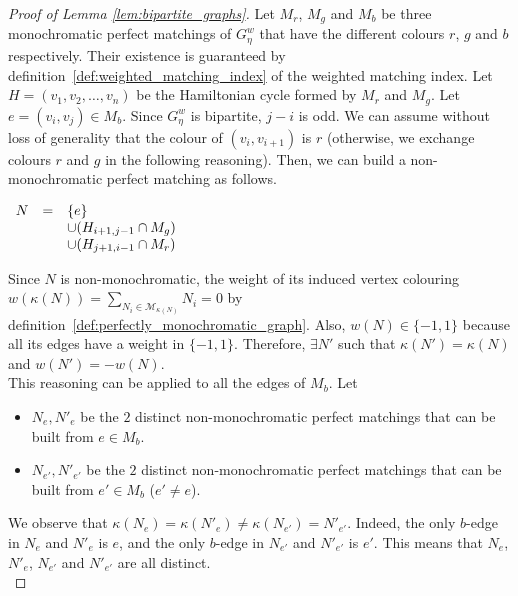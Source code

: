 \begin{proof}[Proof of Lemma \ref{lem:bipartite_graphs}]
    Let $M_r$, $M_g$ and $M_b$ be three monochromatic perfect matchings of $G_\eta^w$ that have the different colours $r$, $g$ and $b$ respectively.
    Their existence is guaranteed by definition~\ref{def:weighted_matching_index} of the weighted matching index.
    Let $H = (v_1, v_2, \dots, v_n)$ be the Hamiltonian cycle formed by $M_r$ and $M_g$.
    Let $e = (v_i, v_j) \in M_b$.
    Since $G_\eta^w$ is bipartite, $j-i$ is odd.
    We can assume without loss of generality that the colour of $(v_i, v_{i+1})$ is $r$ (otherwise, we exchange colours $r$ and $g$ in the following reasoning).
    Then, we can build a non-monochromatic perfect matching as follows.

    \begin{center}
        $\begin{array}{r c l}
            N & = & \{e\}                         \\
              &   & \cup (H_{i+1, j-1} \cap M_g)  \\
              &   & \cup (H_{j+1, i-1} \cap M_r)
        \end{array}$
    \end{center}

    Since $N$ is non-monochromatic, the weight of its induced vertex colouring $w(\kappa(N)) = \sum\limits_{N_i \in \mathcal{M}_{\kappa(N)}} N_i = 0$ by definition~\ref{def:perfectly_monochromatic_graph}.
    Also, $w(N) \in \{-1, 1\}$ because all its edges have a weight in $\{-1, 1\}$.
    Therefore, $\exists N'$ such that $\kappa(N') = \kappa(N)$ and $w(N') = -w(N)$.\\

    This reasoning can be applied to all the edges of $M_b$.
    Let
    \begin{itemize}
        \item $N_e, N'_e$ be the $2$ distinct non-monochromatic perfect matchings that can be built from $e \in M_b$.
        \item $N_{e'}, N'_{e'}$ be the $2$ distinct non-monochromatic perfect matchings that can be built from $e' \in M_b$ ($e' \neq e$).
    \end{itemize}

    We observe that $\kappa(N_e) = \kappa(N'_e) \neq \kappa(N_{e'}) = N'_{e'}$.
    Indeed, the only $b$-edge in $N_e$ and $N'_e$ is $e$, and the only $b$-edge in $N_{e'}$ and $N'_{e'}$ is $e'$.
    This means that $N_e$, $N'_e$, $N_{e'}$ and $N'_{e'}$ are all distinct.\\


\end{proof}

